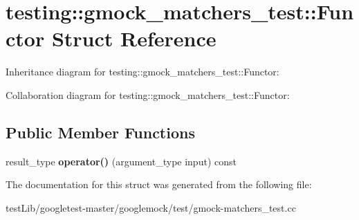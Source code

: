 \hypertarget{structtesting_1_1gmock__matchers__test_1_1Functor}{}\section{testing\+:\+:gmock\+\_\+matchers\+\_\+test\+:\+:Functor Struct Reference}
\label{structtesting_1_1gmock__matchers__test_1_1Functor}


Inheritance diagram for testing\+:\+:gmock\+\_\+matchers\+\_\+test\+:\+:Functor\+:


Collaboration diagram for testing\+:\+:gmock\+\_\+matchers\+\_\+test\+:\+:Functor\+:
\subsection*{Public Member Functions}
\begin{DoxyCompactItemize}
\item 
\mbox{\label{structtesting_1_1gmock__matchers__test_1_1Functor_a5beee965d62e6bc1d591163659bad913}} 
result\+\_\+type {\bfseries operator()} (argument\+\_\+type input) const
\end{DoxyCompactItemize}


The documentation for this struct was generated from the following file\+:\begin{DoxyCompactItemize}
\item 
test\+Lib/googletest-\/master/googlemock/test/gmock-\/matchers\+\_\+test.\+cc\end{DoxyCompactItemize}

